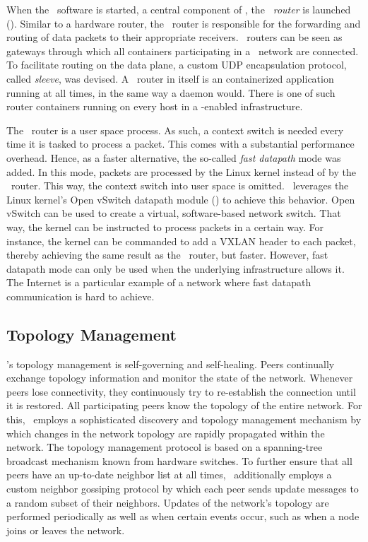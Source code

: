 When the \weave\ software is started, a central component of \wnet , the \emph{\weave\ router} is launched (\cf {}). Similar to a hardware router, the \weave\ router is responsible for the forwarding and routing of data packets to their appropriate receivers. \weave\ routers can be seen as gateways through which all containers participating in a \weave\ network are connected. To facilitate routing on the data plane, a custom UDP encapsulation protocol, called \emph{sleeve}, was devised. A \weave\ router in itself is an containerized application running at all times, in the same way a daemon would. There is one of such router containers running on every host in a \weave -enabled infrastructure.


The \weave\ router is a user space process. As such, a context switch is needed every time it is tasked to process a packet. This comes with a substantial performance overhead. Hence, as a faster alternative, the so-called \emph{fast datapath} mode was added. In this mode, packets are processed by the Linux kernel instead of by the \weave\ router. This way, the context switch into user space is omitted. \wnet\ leverages the Linux kernel's Open vSwitch datapath module (\cf {}) to achieve this behavior. Open vSwitch can be used to create a virtual, software-based network switch. That way, the kernel can be instructed to process packets in a certain way. For instance, the kernel can be commanded to add a VXLAN header to each packet, thereby achieving the same result as the \weave\ router, but faster. However, fast datapath mode can only be used when the underlying infrastructure allows it. The Internet is a particular example of a network where fast datapath communication is hard to achieve.


\subsection{Topology Management}
\weave 's topology management is self-governing and self-healing. Peers continually exchange topology information and monitor the state of the network. Whenever peers lose connectivity, they continuously try to re-establish the connection until it is restored. All participating peers know the topology of the entire network. For this, \wnet\ employs a sophisticated discovery and topology management mechanism by which changes in the network topology are rapidly propagated within the network. The topology management protocol is based on a spanning-tree broadcast mechanism known from hardware switches. To further ensure that all peers have an up-to-date neighbor list at all times, \wnet\ additionally employs a custom neighbor gossiping protocol by which each peer sends update messages to a random subset of their neighbors. Updates of the network's topology are performed periodically as well as when certain events occur, such as when a node joins or leaves the network.

